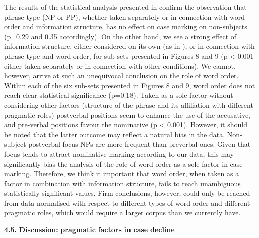 \documentclass[output=paper]{langscibook}
\begin{document}
The results of the statistical analysis presented in  confirm the observation that phrase type (NP or PP), whether taken separately or in connection with word order and information structure, has no effect on case marking on non-subjects (p=0.29 and 0.35 accordingly). On the other hand, we see a strong effect of information structure, either considered on its own (as in ), or in connection with phrase type and word order, for sub-sets presented in Figures 8 and 9 (p < 0.001 either taken separately or in connection with other conditions). We cannot, however, arrive at such an unequivocal conclusion on the role of word order. Within each of the six sub-sets presented in Figures 8 and 9, word order does not reach clear statistical significance (p=0.18). Taken as a sole factor without considering other factors (structure of the phrase and its affiliation with different pragmatic roles) postverbal positions seem to enhance the use of the accusative, and pre-verbal positions favour the nominative (p < 0.001). However, it should be noted that the latter outcome may reflect a natural bias in the data. Non-subject postverbal focus NPs are more frequent than preverbal ones. Given that focus tends to attract nominative marking according to our data, this may significantly bias the analysis of the role of word order as a sole factor in case marking. Therefore, we think it important that word order, when taken as a factor in combination with information structure, fails to reach unambiguous statistically significant values. Firm conclusions, however, could only be reached from data normalised with respect to different types of word order and different pragmatic roles, which would require a larger corpus than we currently have. 

\textbf{4.5.} \textbf{Discussion:} \textbf{pragmatic} \textbf{factors} \textbf{in} \textbf{case} \textbf{decline}
\end{document}
